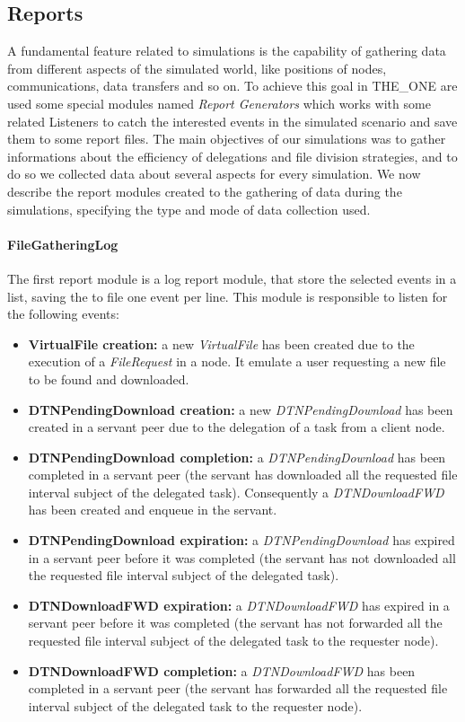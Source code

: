 \subsection{Reports}
A fundamental feature related to simulations is the capability of gathering data from different aspects of the simulated world, like positions of nodes, communications, data transfers and so on. To achieve this goal in THE\_ONE are used some special modules named \textit{Report Generators} which works with some related Listeners to catch the interested events in the simulated scenario and save them to some report files.
The main objectives of our simulations was to gather informations about the efficiency of delegations and file division strategies, and to do so we collected data about several aspects for every simulation. We now describe the report modules created to the gathering of data during the simulations, specifying the type and mode of data collection used.

\paragraph{FileGatheringLog}
The first report module is a log report module, that store the selected events in a list, saving the to file one event per line. This module is responsible to listen for the following events:
\begin{itemize}
\item \textbf{VirtualFile creation:} a new \textit{VirtualFile} has been created due to the execution of a \textit{FileRequest} in a node. It emulate a user requesting a new file to be found and downloaded.
\item \textbf{DTNPendingDownload creation:} a new \textit{DTNPendingDownload} has been created in a servant peer due to the delegation of a task from a client node.
\item \textbf{DTNPendingDownload completion:} a \textit{DTNPendingDownload} has been completed in a servant peer (the servant has downloaded all the requested file interval subject of the delegated task). Consequently a \textit{DTNDownloadFWD} has been created and enqueue in the servant.
\item \textbf{DTNPendingDownload expiration:} a \textit{DTNPendingDownload} has expired in a servant peer before it was completed (the servant has not downloaded all the requested file interval subject of the delegated task).
\item \textbf{DTNDownloadFWD expiration:} a \textit{DTNDownloadFWD} has expired in a servant peer before it was completed (the servant has not forwarded all the requested file interval subject of the delegated task to the requester node).
\item \textbf{DTNDownloadFWD completion:} a \textit{DTNDownloadFWD} has been completed in a servant peer (the servant has forwarded all the requested file interval subject of the delegated task to the requester node).
\end{itemize}

